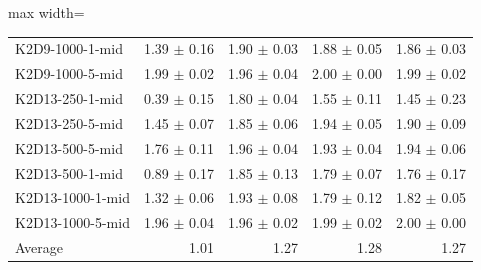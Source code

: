 \documentclass{article}
\begin{document}
\begin{table}[ht]
\begin{center}
\begin{small}
\begin{adjustbox}{max width=\columnwidth}
\begin{tabular}{l|rrrr}
K2D9-1000-1-mid & 1.39 $\pm$ 0.16 & 1.90 $\pm$ 0.03 & 1.88 $\pm$ 0.05 & 1.86 $\pm$ 0.03\\
K2D9-1000-5-mid & 1.99 $\pm$ 0.02 & 1.96 $\pm$ 0.04 & 2.00 $\pm$ 0.00 & 1.99 $\pm$ 0.02\\
K2D13-250-1-mid & 0.39 $\pm$ 0.15 & 1.80 $\pm$ 0.04 & 1.55 $\pm$ 0.11 & 1.45 $\pm$ 0.23\\
K2D13-250-5-mid & 1.45 $\pm$ 0.07 & 1.85 $\pm$ 0.06 & 1.94 $\pm$ 0.05 & 1.90 $\pm$ 0.09\\
K2D13-500-5-mid & 1.76 $\pm$ 0.11 & 1.96 $\pm$ 0.04 & 1.93 $\pm$ 0.04 & 1.94 $\pm$ 0.06\\
K2D13-500-1-mid & 0.89 $\pm$ 0.17 & 1.85 $\pm$ 0.13 & 1.79 $\pm$ 0.07 & 1.76 $\pm$ 0.17\\
K2D13-1000-1-mid & 1.32 $\pm$ 0.06 & 1.93 $\pm$ 0.08 & 1.79 $\pm$ 0.12 & 1.82 $\pm$ 0.05\\
K2D13-1000-5-mid & 1.96 $\pm$ 0.04 & 1.96 $\pm$ 0.02 & 1.99 $\pm$ 0.02 & 2.00 $\pm$ 0.00\\
\midrule
Average & 1.01 & 1.27 & 1.28 & 1.27\\
\end{tabular}
        \end{adjustbox}
    \end{small}
    \end{center}
    \vskip -0.1in
\end{table}
\end{document}

